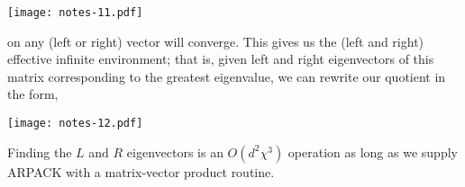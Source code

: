 \documentclass[12pt]{amsart}
\begin{document}
    \begin{center}\texttt{[image: notes-11.pdf]}\end{center}

\noindent on any (left or right) vector will converge.  This gives us the (left and right) effective infinite environment;  that is, given left and right eigenvectors of this matrix corresponding to the greatest eigenvalue, we can rewrite our quotient in the form,

    \begin{center}\texttt{[image: notes-12.pdf]}\end{center}

Finding the $L$ and $R$ eigenvectors is an $O(d^2\chi^3)$ operation as long as we supply ARPACK with a matrix-vector product routine.
\end{document}

